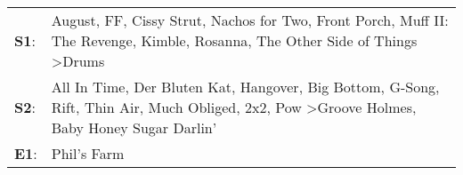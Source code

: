 \begin{supertabular}{p{0.03\textwidth}p{0.92\textwidth}}
 \textbf{S1}:  &                                                                      August\textsuperscript{}, \enspace FF\textsuperscript{}, \enspace Cissy Strut\textsuperscript{}, \enspace Nachos for Two\textsuperscript{}, \enspace Front Porch\textsuperscript{}, \enspace Muff II: The Revenge\textsuperscript{}, \enspace Kimble\textsuperscript{}, \enspace Rosanna\textsuperscript{}, \enspace The Other Side of Things\textsuperscript{} \textgreater \enspace Drums\textsuperscript{}  \enspace  \\
 \textbf{S2}:  &  All In Time\textsuperscript{}, \enspace Der Bluten Kat\textsuperscript{}, \enspace Hangover\textsuperscript{}, \enspace Big Bottom\textsuperscript{}, \enspace G-Song\textsuperscript{}, \enspace Rift\textsuperscript{}, \enspace Thin Air\textsuperscript{}, \enspace Much Obliged\textsuperscript{}, \enspace 2x2\textsuperscript{}, \enspace Pow\textsuperscript{} \textgreater \enspace Groove Holmes\textsuperscript{}, \enspace Baby Honey Sugar Darlin'\textsuperscript{}  \enspace  \\
 \textbf{E1}:  &                                                                                                                                                                                                                                                                                                                                                                                                                                                      Phil's Farm\textsuperscript{}  \enspace  \\
\end{supertabular}
